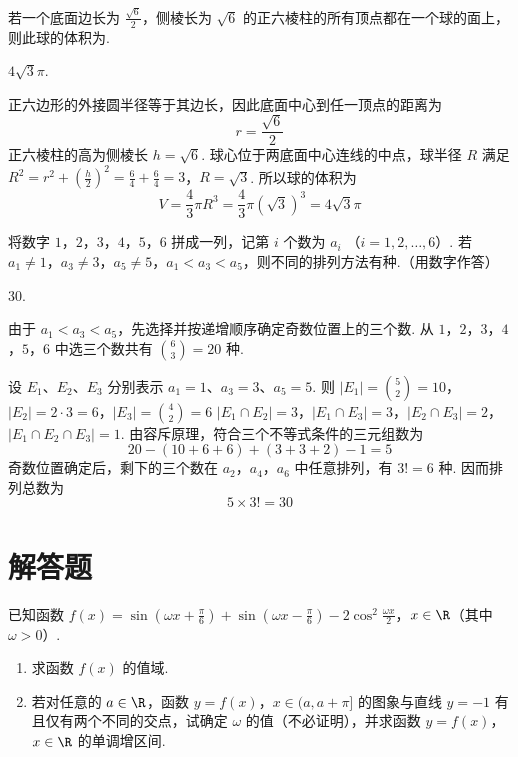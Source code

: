 \begin{problem}
若一个底面边长为 \(\frac{\sqrt{6}}{2}\)，侧棱长为 \(\sqrt{6}\) 的正六棱柱的所有顶点都在一个球的面上，则此球的体积为\fillinblank{}.
\end{problem}

\begin{answer}
\(4\sqrt{3}\pi\).
\end{answer}

\begin{solution}
正六边形的外接圆半径等于其边长，因此底面中心到任一顶点的距离为
\[
r=\frac{\sqrt{6}}{2}
\]
正六棱柱的高为侧棱长 \(h=\sqrt{6}\). 球心位于两底面中心连线的中点，球半径 \(R\) 满足
\(R^2=r^2+\left(\frac{h}{2}\right)^2 =\frac{6}{4}+\frac{6}{4}=3\)，\(R=\sqrt{3}\).
所以球的体积为
\[
V=\frac{4}{3}\pi R^3=\frac{4}{3}\pi(\sqrt{3})^3=4\sqrt{3}\pi
\]
\end{solution}


\begin{problem}
将数字 \(1\)，\(2\)，\(3\)，\(4\)，\(5\)，\(6\) 拼成一列，记第 \(i\) 个数为 \(a_i\) （\(i = 1, 2, \ldots, 6\)）. 若 \(a_1 \neq 1\)，\(a_3 \neq 3\)，\(a_5 \neq 5\)，\(a_1 < a_3 < a_5\)，则不同的排列方法有\fillinblank{}种.（用数字作答）
\end{problem}

\begin{answer}
30.
\end{answer}

\begin{solution}
由于 \(a_1<a_3<a_5\)，先选择并按递增顺序确定奇数位置上的三个数. 从 \(1\)，\(2\)，\(3\)，\(4\)，\(5\)，\(6\) 中选三个数共有 \(\binom{6}{3}=20\) 种.

设 \(E_1\)、\(E_2\)、\(E_3\) 分别表示 \(a_1=1\)、\(a_3=3\)、\(a_5=5\). 则
\(|E_1|=\binom{5}{2}=10\)，\(|E_2|=2\cdot3=6\)，\(|E_3|=\binom{4}{2}=6\)
\(|E_1\cap E_2|=3\)，\(|E_1\cap E_3|=3\)，\(|E_2\cap E_3|=2\)，\(|E_1\cap E_2\cap E_3|=1\).
由容斥原理，符合三个不等式条件的三元组数为
\[
20-(10+6+6)+(3+3+2)-1=5
\]
奇数位置确定后，剩下的三个数在 \(a_2\)，\(a_4\)，\(a_6\) 中任意排列，有 \(3!=6\) 种. 因而排列总数为
\[
5\times3!=30
\]
\end{solution}


\section{解答题}

\begin{problem}
已知函数 \(f(x) = \sin \left(\omega x + \frac{\pi}{6}\right) + \sin \left(\omega x - \frac{\pi}{6}\right) - 2 \cos^2 \frac{\omega x}{2}\)，\(x \in \R\)（其中 \(\omega > 0\)）.

\begin{enumerate}
\item 求函数 \(f(x)\) 的值域.
\item 若对任意的 \(a \in \R\)，函数 \(y = f(x)\)，\(x \in (a, a + \pi]\) 的图象与直线 \(y = -1\) 有且仅有两个不同的交点，试确定 \(\omega\) 的值（不必证明），并求函数 \(y = f(x)\)，\(x \in \R\) 的单调增区间.
\end{enumerate}
\end{problem}

